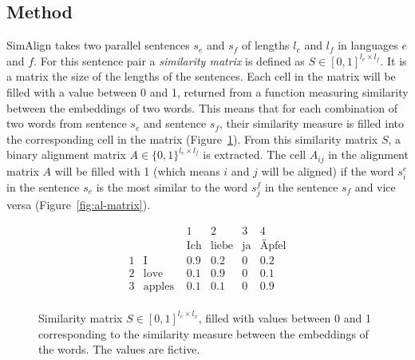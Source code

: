 \subsection{Method}
\label{subsec:simalign-method}
SimAlign takes two parallel sentences $s_e$ and $s_f$ of lengths $l_e$ and $l_f$ in languages $e$ and $f$. 
For this sentence pair a \emph{similarity matrix} is defined as $S \in [0,1]^{l_e\times l_f}$. 
It is a matrix the size of the lengths of the sentences. Each cell in the matrix will be filled with a value between 0 and 1, returned from a function measuring similarity between the embeddings of two words. 
This means that for each combination of two words from sentence $s_e$ and sentence $s_f$, their similarity measure is filled into the corresponding cell in the matrix (Figure~\ref{fig:sim-matrix}).
From this similarity matrix $S$, a binary alignment matrix $A \in \{0,1\}^{l_e \times l_f}$ is extracted. 
The cell $A_{ij}$ in the alignment matrix $A$ will be filled with 1 (which means $i$ and $j$ will be aligned) if the word $s_i^e$ in the sentence $s_e$ is the most similar to the word $s_j^f$ in the sentence $s_f$ and vice versa (Figure~\ref{fig:al-matrix}).



\begin{figure}
\[
	\begin{array}{rl|c|c|c|c}
& &1 & 2 & 3 & 4\\
& &\text{Ich} & \text{liebe} & \text{ja} & \text{Äpfel} \\
\hline
1 & \text{I} & 0.9 & 0.2 & 0 &0.2 \\ 
\hline
2 & \text{love} & 0.1 & 0.9 &0 & 0.1 \\
\hline
3 & \text{apples } & 0.1& 0.1 & 0 & 0.9\\
\end{array}
\]
\captionsetup{width=.6\linewidth}
\caption[Similarity matrix]{Similarity matrix $S \in [0,1]^{l_e \times l_x}$, filled with values between 0 and 1 corresponding to the similarity measure between the embeddings of the words. 
The values are fictive.}
\label{fig:sim-matrix}
\end{figure}

